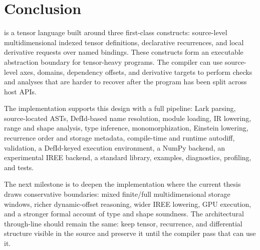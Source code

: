 \chapter{Conclusion}

\einlang{} is a tensor language built around three first-class constructs:
source-level multidimensional indexed tensor definitions, declarative
recurrences, and local derivative requests over named bindings. These constructs
form an executable abstraction boundary for tensor-heavy programs. The compiler
can use source-level axes, domains, dependency offsets, and derivative targets
to perform checks and analyses that are harder to recover after the program has
been split across host APIs.

The implementation supports this design with a full pipeline: Lark parsing,
source-located ASTs, DefId-based name resolution, module loading, IR lowering,
range and shape analysis, type inference, monomorphization, Einstein lowering,
recurrence order and storage metadata, compile-time and runtime autodiff,
validation, a DefId-keyed execution environment, a NumPy backend, an
experimental IREE backend, a standard library, examples, diagnostics, profiling,
and tests.

The next milestone is to deepen the implementation where the current thesis
draws conservative boundaries: mixed finite/full multidimensional storage
windows, richer dynamic-offset reasoning, wider IREE lowering, GPU execution,
and a stronger formal account of type and shape soundness. The architectural
through-line should remain the same: keep tensor, recurrence, and differential
structure visible in the source and preserve it until the compiler pass that can
use it.
